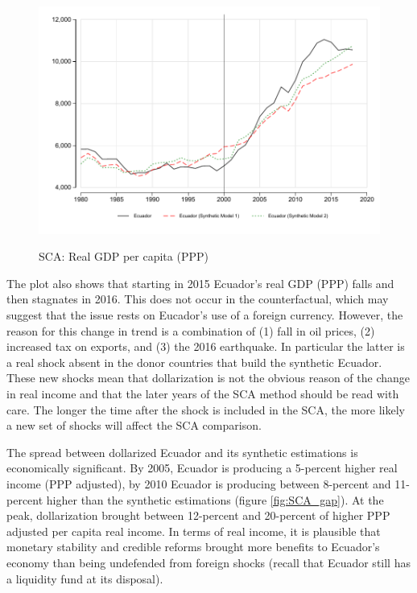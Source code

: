 \documentclass[12pt]{article}
\begin{document}
\begin{figure}[!h]
    \caption{SCA: Real GDP per capita (PPP)}
    \centering
    \includegraphics{STATA/Fig_GDP_SCA.pdf}
    \label{fig:SCA_GDP}
\end{figure}

The plot also shows that starting in 2015 Ecuador's real GDP (PPP) falls and then stagnates in 2016. This does not occur in the counterfactual, which may suggest that the issue rests on Eucador's use of a foreign currency. However, the reason for this change in trend is a combination of (1) fall in oil prices, (2) increased tax on exports, and (3) the 2016 earthquake. In particular the latter is a real shock absent in the donor countries that build the synthetic Ecuador. These new shocks mean that dollarization is not the obvious reason of the change in real income and that the later years of the SCA method should be read with care. The longer the time after the shock is included in the SCA, the more likely a new set of shocks will affect the SCA comparison.

The spread between dollarized Ecuador and its synthetic estimations is economically significant. By 2005, Ecuador is producing a 5-percent higher real income (PPP adjusted), by 2010 Ecuador is producing between 8-percent and 11-percent higher than the synthetic estimations (figure \ref{fig:SCA_gap}). At the peak, dollarization brought between 12-percent and 20-percent of higher PPP adjusted per capita real income. In terms of real income, it is plausible that monetary stability and credible reforms brought more benefits to Ecuador's economy than being undefended from foreign shocks (recall that Ecuador still has a liquidity fund at its disposal).
\end{document}
